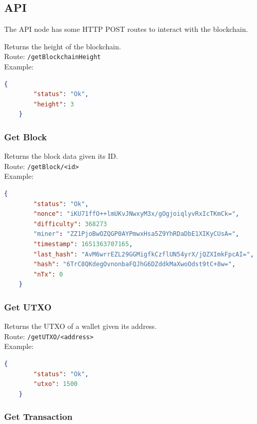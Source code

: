 \documentclass[../documentation.tex]{subfiles}
\begin{document}
\pagebreak

\subsection{API}

The API node has some HTTP POST routes to interact with the blockchain.


Returns the height of the blockchain.
\\
Route: \texttt{/getBlockchainHeight}
\\
Example:
\begin{lstlisting}[language=json]
    {
        "status": "Ok",
        "height": 3
    }
\end{lstlisting}

\subsubsection{Get Block}

Returns the block data given its ID.
\\
Route: \texttt{/getBlock/<id>}
\\
Example:
\begin{lstlisting}[language=json]
    {
        "status": "Ok",
        "nonce": "iKU71ffO++lmUKvJNwxyM3x/gOgjoiqlyvRxIcTKmCk=",
        "difficulty": 368273
        "miner": "ZZ1PjoBwOZQGP0AYPmwxHsa5Z9YhRDaDbE1XIKyCUsA=",
        "timestamp": 1651363707165,
        "last_hash": "AvM6wrrEZL29GGMigfkCzflUN54yrX/jQZXImkFpcAI=",
        "hash": "6TrC8QKdegOvnonbaFQJhG6DZddkMaXwoOdst9tC+8w=",
        "nTx": 0
    }
\end{lstlisting}

\subsubsection{Get UTXO}

Returns the UTXO of a wallet given its address.
\\
Route: \texttt{/getUTXO/<address>}
\\
Example:
\begin{lstlisting}[language=json]
    {
        "status": "Ok",
        "utxo": 1500
    }
\end{lstlisting}

\pagebreak

\subsubsection{Get Transaction}
\end{document}
